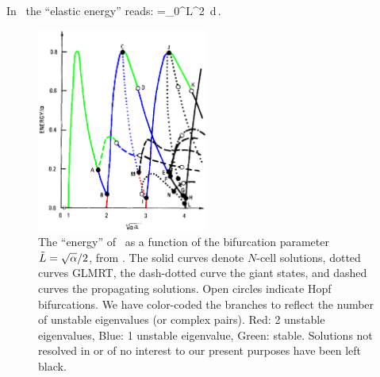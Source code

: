 In  \ the ``elastic energy'' reads:
\beq
    =\int_0^{L}^2\, d\,.
\eeq


\begin{figure}[t]
\centering
\includegraphics[width=0.5\textwidth]{figs/GreeneKimBifColor.eps}
\caption{
    {\small
The ``energy'' of \eqva\ as a function of the bifurcation
parameter $\tilde{L}=\sqrt{\alpha}/2$, from .
The solid curves denote $N$-cell solutions,
dotted curves GLMRT, the dash-dotted curve the
giant states, and dashed curves the propagating solutions.
Open circles indicate Hopf bifurcations. 
We have color-coded the branches to reflect the number of unstable
eigenvalues (or complex pairs). Red: 2 unstable eigenvalues, Blue: 1
unstable eigenvalue, Green: stable. Solutions not 
resolved in  or of no interest
to our present purposes have been left black.
        } %
        }
\label{fig:GreeneKim}
\end{figure}


